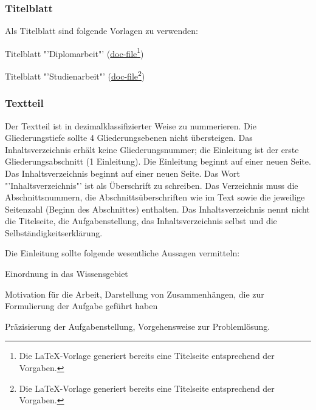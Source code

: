 \subsubsection{Titelblatt}
\label{sec:Titelblatt}

Als Titelblatt sind folgende Vorlagen zu verwenden:

\begin{compactitem}
  \item Titelblatt "'Diplomarbeit"' (\href{http://www.et.tu-dresden.de/ifa/fileadmin/user_upload/www_files/richtlinien_sa_da/DA-Deckblatt_IfA.doc}{doc-file}\footnote{Die LaTeX-Vorlage generiert bereits eine Titelseite entsprechend der Vorgaben.})
    \item Titelblatt "'Studienarbeit"' (\href{http://www.et.tu-dresden.de/ifa/fileadmin/user_upload/www_files/richtlinien_sa_da/SA-Deckblatt_IfA.doc}{doc-file}\footnote{Die LaTeX-Vorlage generiert bereits eine Titelseite entsprechend der Vorgaben.})
\end{compactitem}


\subsubsection{Textteil}
\label{sec:Textteil}

Der Textteil ist in dezimalklassifizierter Weise zu nummerieren. Die Gliederungstiefe sollte 4 Gliederungsebenen nicht übersteigen. Das Inhaltsverzeichnis erhält keine Gliederungsnummer; die Einleitung ist der erste Gliederungsabschnitt (1 Einleitung). Die Einleitung beginnt auf einer neuen Seite.
Das Inhaltsverzeichnis beginnt auf einer neuen Seite. Das Wort "'Inhaltsverzeichnis"' ist als Überschrift zu schreiben. Das Verzeichnis muss die Abschnittsnummern, die Abschnittsüberschriften wie im Text sowie die jeweilige Seitenzahl (Beginn des Abschnittes) enthalten.
Das Inhaltsverzeichnis nennt nicht die Titelseite, die Aufgabenstellung, das Inhaltsverzeichnis selbst und die Selbständigkeitserklärung.

Die Einleitung sollte folgende wesentliche Aussagen vermitteln:
\begin{compactitem}
  \item Einordnung in das Wissensgebiet
  \item Motivation für die Arbeit, Darstellung von Zusammenhängen, die zur Formulierung der Aufgabe geführt haben
  \item Präzisierung der Aufgabenstellung, Vorgehensweise zur Problemlösung.
\end{compactitem}

